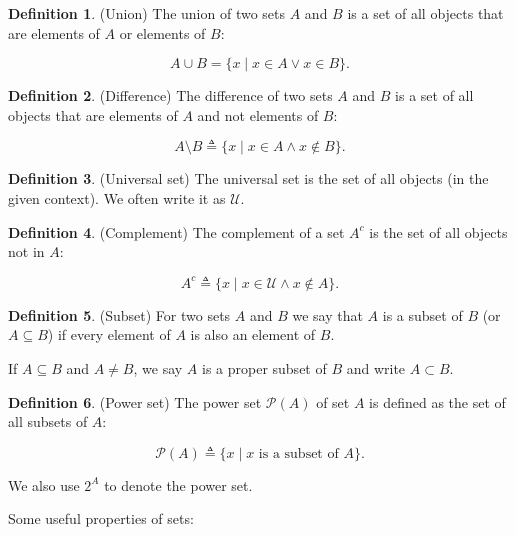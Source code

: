 \documentclass{book}
\theoremstyle{plain}%
\theoremstyle{definition}
\newtheorem{definition}{Definition}[section]
\begin{document}
\begin{appendices}
\begin{definition}(Union) The union of two sets $A$ and $B$ is a set of all objects that are elements of $A$ or elements of $B$:

$$A \cup B = \{x \mid x \in A \vee x \in B\}.$$
\end{definition}

\begin{definition}(Difference) The difference of two sets $A$ and $B$ is a set of all objects that are elements of $A$ and not elements of $B$:

$$A \setminus B \triangleq \{x \mid x \in A \wedge x \notin B\}.$$
\end{definition}

\begin{definition}(Universal set) The universal set is the set of all objects (in the given context). We often write it as $\mathcal{U}$.
\end{definition}

\begin{definition}(Complement) The complement of a set $A^c$ is the set of all objects not in $A$:

$$A^c \triangleq \{x \mid x \in \mathcal{U} \wedge x \notin A\}.$$
\end{definition}

\begin{definition}(Subset) For two sets $A$ and $B$ we say that $A$ is a subset of $B$ (or $A \subseteq B$) if every element of $A$ is also an element of $B$. 

If $A \subseteq B$ and $A \neq B$, we say $A$ is a proper subset of $B$ and write $A \subset B$.
\end{definition}

\begin{definition}(Power set) The power set $\mathcal{P}(A)$ of set $A$ is defined as the set of all subsets of $A$:

$$\mathcal{P}(A) \triangleq \{x \mid x \text{ is a subset of } A\}.$$

We also use $2^A$ to denote the power set.
\end{definition}


Some useful properties of sets:


\end{appendices}
\end{document}
